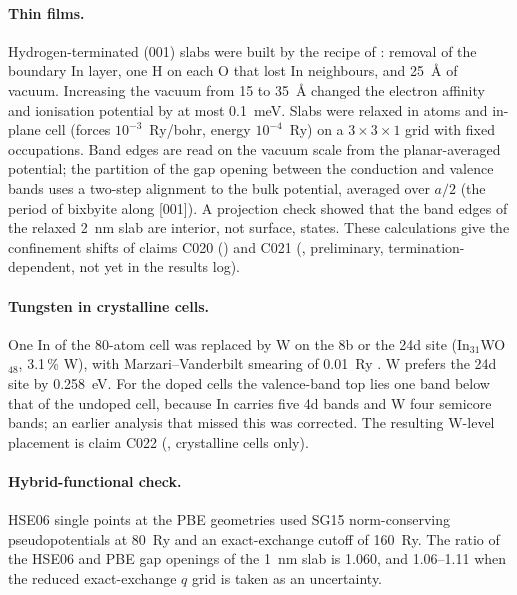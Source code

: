 \paragraph{Thin films.} Hydrogen-terminated (001) slabs were built by the recipe of \citet[p.~21542]{Lin2022}:
removal of the boundary In layer, one H on each O that lost In neighbours, and \SI{25}{\angstrom} of vacuum. %
Increasing the vacuum from 15 to \SI{35}{\angstrom} changed the electron affinity and ionisation potential by at most
0.1~meV. %
Slabs were relaxed in atoms and in-plane cell (forces $10^{-3}$~Ry/bohr, energy $10^{-4}$~Ry) on a
$3\times3\times1$ grid with fixed occupations. %
Band edges are read on the vacuum scale from the planar-averaged potential; the partition of the gap opening between
the conduction and valence bands uses a two-step alignment to the bulk potential, averaged over $a/2$ (the period of
bixbyite along [001]). %
A projection check showed that the band edges of the relaxed \SI{2}{nm} slab are interior, not surface, states. %
These calculations give the confinement shifts of claims C020 () and C021 (,
preliminary, termination-dependent, not yet in the results log). %

\paragraph{Tungsten in crystalline cells.} One In of the 80-atom cell was replaced by W on the 8b or the 24d site
(In$_{31}$WO$_{48}$, 3.1\,\% W), with Marzari--Vanderbilt smearing of 0.01~Ry \citep{Marzari1999}. %
W prefers the 24d site by 0.258~eV. %
For the doped cells the valence-band top lies one band below that of the undoped cell, because In carries five
4d bands and W four semicore bands; an earlier analysis that missed this was corrected. %
The resulting W-level placement is claim C022 (, crystalline cells only). %

\paragraph{Hybrid-functional check.} HSE06 \citep{Heyd2003,Krukau2006} single points at the PBE geometries used SG15
norm-conserving pseudopotentials at 80~Ry \citep{Hamann2013,Schlipf2015} and an exact-exchange cutoff of 160~Ry. %
The ratio of the HSE06 and PBE gap openings of the \SI{1}{nm} slab is 1.060, and 1.06--1.11 when the reduced
exact-exchange $q$ grid is taken as an uncertainty. %

